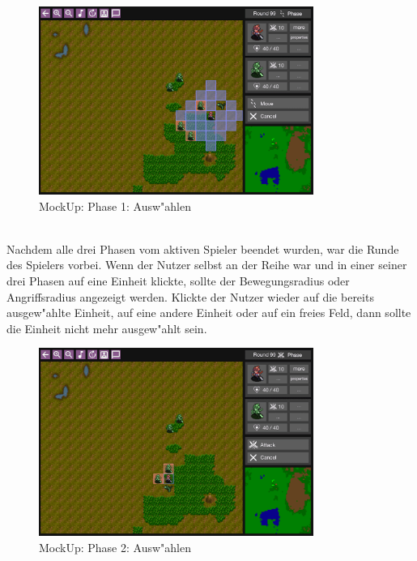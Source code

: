 \documentclass[12pt, titlepage]{scrartcl}
\begin{document}
			        \begin{figure}[H] 
    				    \centering
    				    \includegraphics[width=0.8\textwidth]{images/mockUps/Select.png}
    				    \caption{MockUp: Phase 1: Ausw"ahlen}
    				    \label{Select_1}
			        \end{figure}
			        \ \\ Nachdem alle drei Phasen vom aktiven Spieler beendet wurden, war die Runde des Spielers vorbei. Wenn der Nutzer selbst an der Reihe war und in einer seiner drei Phasen auf eine Einheit klickte, sollte der Bewegungsradius oder Angriffsradius angezeigt werden. Klickte der Nutzer wieder auf die bereits ausgew"ahlte Einheit, auf eine andere Einheit oder auf ein freies Feld, dann sollte die Einheit nicht mehr ausgew"ahlt sein. \\
                    \begin{figure}[H] 
    				    \centering
    				    \includegraphics[width=0.8\textwidth]{images/mockUps/Select3.png}
    				    \caption{MockUp: Phase 2: Ausw"ahlen}
    				    \label{Select_2}
			        \end{figure} 
\end{document}
